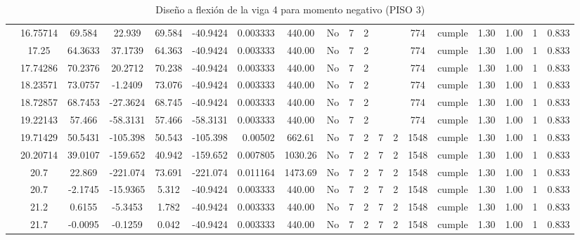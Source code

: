 \begin{table}[H]
{\begin{tabular}{|c|c|c|c|c|c|r|c|c|c|c|c|c|c|c|c|c|c|c|}
\cline{2-19}        & 16.75714 & 69.584 & 22.939 & 69.584 & -40.9424 & 0.003333 & 440.00 & No  & 7   & 2   &     &     & 774 & \cellcolor[rgb]{ .776,  .937,  .808}cumple & 1.30 & 1.00 & 1   & 0.833 \bigstrut\\
\cline{2-19}        & 17.25 & 64.3633 & 37.1739 & 64.363 & -40.9424 & 0.003333 & 440.00 & No  & 7   & 2   &     &     & 774 & \cellcolor[rgb]{ .776,  .937,  .808}cumple & 1.30 & 1.00 & 1   & 0.833 \bigstrut\\
\cline{2-19}        & 17.74286 & 70.2376 & 20.2712 & 70.238 & -40.9424 & 0.003333 & 440.00 & No  & 7   & 2   &     &     & 774 & \cellcolor[rgb]{ .776,  .937,  .808}cumple & 1.30 & 1.00 & 1   & 0.833 \bigstrut\\
\cline{2-19}        & 18.23571 & 73.0757 & -1.2409 & 73.076 & -40.9424 & 0.003333 & 440.00 & No  & 7   & 2   &     &     & 774 & \cellcolor[rgb]{ .776,  .937,  .808}cumple & 1.30 & 1.00 & 1   & 0.833 \bigstrut\\
\cline{2-19}        & 18.72857 & 68.7453 & -27.3624 & 68.745 & -40.9424 & 0.003333 & 440.00 & No  & 7   & 2   &     &     & 774 & \cellcolor[rgb]{ .776,  .937,  .808}cumple & 1.30 & 1.00 & 1   & 0.833 \bigstrut\\
\cline{2-19}        & 19.22143 & 57.466 & -58.3131 & 57.466 & -58.3131 & 0.003333 & 440.00 & No  & 7   & 2   &     &     & 774 & \cellcolor[rgb]{ .776,  .937,  .808}cumple & 1.30 & 1.00 & 1   & 0.833 \bigstrut\\
\cline{2-19}        & 19.71429 & 50.5431 & -105.398 & 50.543 & -105.398 & 0.00502 & 662.61 & No  & 7   & 2   & 7   & 2   & 1548 & \cellcolor[rgb]{ .776,  .937,  .808}cumple & 1.30 & 1.00 & 1   & 0.833 \bigstrut\\
\cline{2-19}        & 20.20714 & 39.0107 & -159.652 & 40.942 & -159.652 & 0.007805 & 1030.26 & No  & 7   & 2   & 7   & 2   & 1548 & \cellcolor[rgb]{ .776,  .937,  .808}cumple & 1.30 & 1.00 & 1   & 0.833 \bigstrut\\
\cline{2-19}        & \cellcolor[rgb]{ .851,  .882,  .949}20.7 & 22.869 & -221.074 & 73.691 & -221.074 & 0.011164 & 1473.69 & No  & 7   & 2   & 7   & 2   & 1548 & \cellcolor[rgb]{ .776,  .937,  .808}cumple & 1.30 & 1.00 & 1   & 0.833 \bigstrut\\
\cline{2-19}        & \cellcolor[rgb]{ .851,  .882,  .949}20.7 & -2.1745 & -15.9365 & 5.312 & -40.9424 & 0.003333 & 440.00 & No  & 7   & 2   & 7   & 2   & 1548 & \cellcolor[rgb]{ .776,  .937,  .808}cumple & 1.30 & 1.00 & 1   & 0.833 \bigstrut\\
\cline{2-19}        & 21.2 & 0.6155 & -5.3453 & 1.782 & -40.9424 & 0.003333 & 440.00 & No  & 7   & 2   & 7   & 2   & 1548 & \cellcolor[rgb]{ .776,  .937,  .808}cumple & 1.30 & 1.00 & 1   & 0.833 \bigstrut\\
\cline{2-19}        & 21.7 & -0.0095 & -0.1259 & 0.042 & -40.9424 & 0.003333 & 440.00 & No  & 7   & 2   & 7   & 2   & 1548 & \cellcolor[rgb]{ .776,  .937,  .808}cumple & 1.30 & 1.00 & 1   & 0.833 \bigstrut\\
    \hline
    \end{tabular}%
  

 
  }
      \caption{Diseño a flexión de la viga 4 para momento negativo (PISO 3) }
  \label{tab:F VG4 P2 M-}%
\end{table}%
